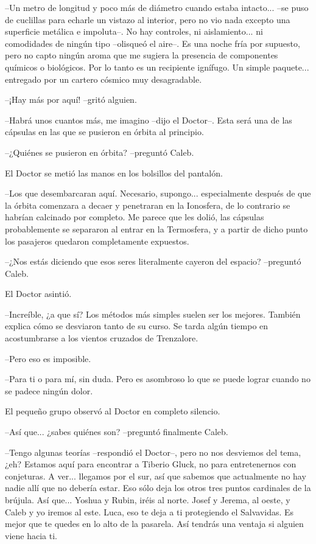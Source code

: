 --Un metro de longitud y poco más de diámetro cuando estaba intacto... --se puso de cuclillas para echarle un vistazo al interior, pero no vio nada excepto una superficie metálica e impoluta--. No hay controles, ni aislamiento... ni comodidades de ningún tipo --olisqueó el aire--. Es una noche fría por supuesto, pero no capto ningún aroma que me sugiera la presencia de componentes químicos o biológicos. Por lo tanto es un recipiente ignífugo. Un simple paquete... entregado por un cartero cósmico muy desagradable.
 
--¡Hay más por aquí! --gritó alguien.
 
--Habrá unos cuantos más, me imagino --dijo el Doctor--. Esta será una de las cápsulas en las que se pusieron en órbita al principio.
 
--¿Quiénes se pusieron en órbita? --preguntó Caleb.
 
El Doctor se metió las manos en los bolsillos del pantalón.
 
--Los que desembarcaran aquí. Necesario, supongo... especialmente después de que la órbita comenzara a decaer y penetraran en la Ionosfera, de lo contrario se habrían calcinado por completo. Me parece que les dolió, las cápsulas probablemente se separaron al entrar en la Termosfera, y a partir de dicho punto los pasajeros quedaron completamente expuestos.
 
--¿Nos estás diciendo que esos seres literalmente cayeron del espacio? --preguntó Caleb.
 
El Doctor asintió.
 
--Increíble, ¿a que sí? Los métodos más simples suelen ser los mejores. También explica cómo se desviaron tanto de su curso. Se tarda algún tiempo en acostumbrarse a los vientos cruzados de Trenzalore.
 
--Pero eso es imposible.
 
--Para ti o para mí, sin duda. Pero es asombroso lo que se puede lograr cuando no se padece ningún dolor.
 
El pequeño grupo observó al Doctor en completo silencio.
 
--Así que... ¿sabes quiénes son? --preguntó finalmente Caleb.
 
--Tengo algunas teorías --respondió el Doctor--, pero no nos desviemos del tema, ¿eh? Estamos aquí para encontrar a Tiberio Gluck, no para entretenernos con conjeturas. A ver... llegamos por el sur, así que sabemos que actualmente no hay nadie allí que no debería estar. Eso sólo deja los otros tres puntos cardinales de la brújula. Así que... Yoshua y Rubin, iréis al norte. Josef y Jerema, al oeste, y Caleb y yo iremos al este. Luca, eso te deja a ti protegiendo el Salvavidas. Es mejor que te quedes en lo alto de la pasarela. Así tendrás una ventaja si alguien viene hacia ti.
 
